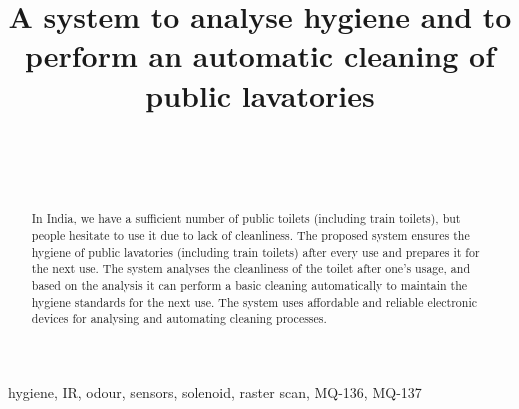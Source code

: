 \documentclass[conference]{IEEEtran}
\begin{document}
\title{A system to analyse hygiene and to perform an automatic cleaning of public lavatories\\
{%
}
}
\author{
    \\
    
    \and
    
    \\
    
    }
\maketitle

\begin{abstract}
In India, we have a sufficient number of public toilets (including train toilets), but people hesitate to use it due to lack of cleanliness. The proposed system ensures the hygiene of public lavatories (including train toilets) after every use and prepares it for the next use. The system analyses the cleanliness of the toilet after one's usage, and based on the analysis it can perform a basic cleaning automatically to maintain the hygiene standards for the next use. The system uses affordable and reliable electronic devices for analysing and automating cleaning processes.

\end{abstract}
\begin{IEEEkeywords}
hygiene, IR, odour, sensors, solenoid, raster scan, MQ-136, MQ-137
\end{IEEEkeywords}
\end{document}
